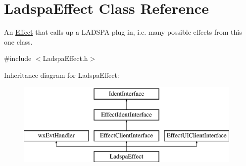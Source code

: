 \hypertarget{class_ladspa_effect}{}\section{Ladspa\+Effect Class Reference}
\label{class_ladspa_effect}


An \hyperlink{class_effect}{Effect} that calls up a L\+A\+D\+S\+PA plug in, i.\+e. many possible effects from this one class.  




{\ttfamily \#include $<$Ladspa\+Effect.\+h$>$}

Inheritance diagram for Ladspa\+Effect\+:\begin{figure}[H]
\begin{center}
\leavevmode
\includegraphics[height=4.000000cm]{class_ladspa_effect}
\end{center}
\end{figure}
